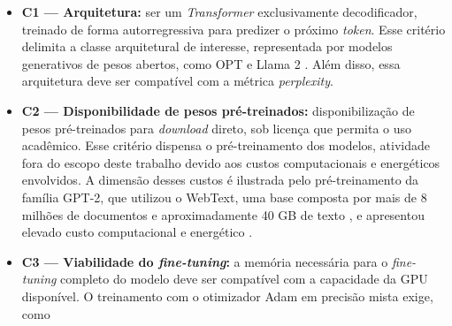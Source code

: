 \begin{itemize}
    \item \textbf{C1 --- Arquitetura:} ser um \textit{Transformer} exclusivamente
          decodificador, treinado de forma autorregressiva para predizer o próximo
          \textit{token}. Esse critério delimita a classe arquitetural de interesse,
          representada por modelos generativos de pesos abertos, como OPT e Llama 2
          \cite{Touvron2023,Zhang2022}. Além disso, essa arquitetura deve ser compatível
          com a métrica \textit{perplexity}.
    \item \textbf{C2 --- Disponibilidade de pesos pré-treinados:} disponibilização de pesos
          pré-treinados para \textit{download} direto, sob licença que permita o uso
          acadêmico. Esse critério dispensa o pré-treinamento dos modelos, atividade fora do
          escopo deste trabalho devido aos custos computacionais e energéticos envolvidos. A
          dimensão desses custos é ilustrada pelo pré-treinamento da família GPT-2, que
          utilizou o WebText, uma base composta por mais de 8 milhões de documentos e
          aproximadamente 40 GB de texto \cite{Radford2019}, e apresentou elevado custo
          computacional e energético \cite{Strubell2019}.
    \item \textbf{C3 --- Viabilidade do \textit{fine-tuning}:} a memória necessária para o
          \textit{fine-tuning} completo do modelo deve ser compatível com a capacidade da
          GPU disponível. O treinamento com o otimizador Adam em precisão mista exige, como

\end{itemize}
